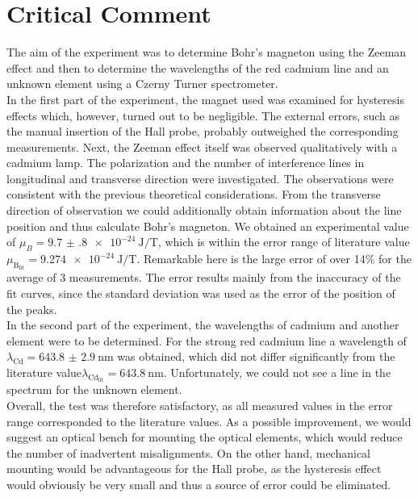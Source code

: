 \section{Critical Comment}
The aim of the experiment was to determine Bohr's magneton using the Zeeman effect and then to determine the wavelengths of the red cadmium line and an unknown element using a Czerny Turner spectrometer.\\
In the first part of the experiment, the magnet used was examined for hysteresis effects which, however, turned out to be negligible.
The external errors, such as the manual insertion of the Hall probe, probably outweighed the corresponding measurements.
Next, the Zeeman effect itself was observed qualitatively with a cadmium lamp.
The polarization and the number of interference lines in longitudinal and transverse direction were investigated.
The observations were consistent with the previous theoretical considerations.
From the transverse direction of observation we could additionally obtain information about the line position and thus calculate Bohr's magneton.
We obtained an experimental value of $\mu_{B} = \SI{9.7(8)e-24}{\joule\per\tesla}$, which is within the error range of literature value\\ $\mu_{\text{B}_\text{lit}} = \SI{9.274e-24}{\joule\per\tesla}$.
Remarkable here is the large error of over 14\% for the average of 3 measurements.
The error results mainly from the inaccuracy of the fit curves, since the standard deviation was used as the error of the position of the peaks.\\
In the second part of the experiment, the wavelengths of cadmium and another element were to be determined. For the strong red cadmium line a wavelength of $\lambda_\text{Cd}= \SI{643.8(29)}{\nano\meter}$ was obtained, which did not differ significantly from the literature value$\lambda_{\text{Cd}_\text{lit}} = \SI{643.8}{\nano\meter}$.
Unfortunately, we could not see a line in the spectrum for the unknown element.\\
Overall, the test was therefore satisfactory, as all measured values in the error range corresponded to the literature values.
As a possible improvement, we would suggest an optical bench for mounting the optical elements, which would reduce the number of inadvertent misalignments.
On the other hand, mechanical mounting would be advantageous for the Hall probe, as the hysteresis effect would obviously be very small and thus a source of error could be eliminated.